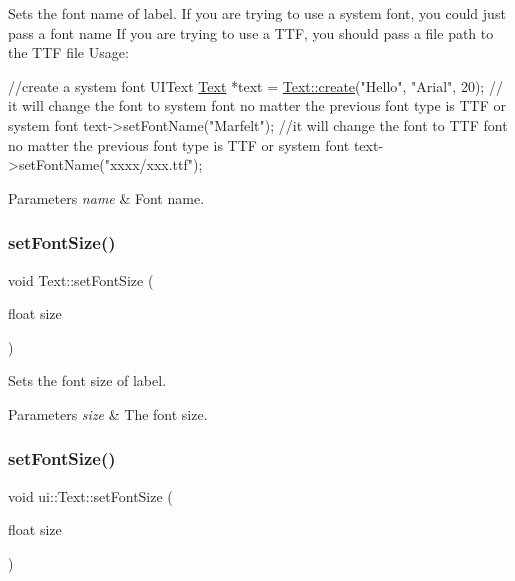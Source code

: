 Sets the font name of label. If you are trying to use a system font, you could just pass a font name If you are trying to use a T\+TF, you should pass a file path to the T\+TF file Usage\+: 
\begin{DoxyCode}
 \textcolor{comment}{//create a system font UIText}
\hyperlink{classText}{Text} *text = \hyperlink{classui_1_1Text_aafdd02d8f0b256cb4997ada4f146e2c2}{Text::create}(\textcolor{stringliteral}{"Hello"}, \textcolor{stringliteral}{"Arial"}, 20);
\textcolor{comment}{// it will change the font to system font no matter the previous font type is TTF or system font}
text->setFontName(\textcolor{stringliteral}{"Marfelt"});
\textcolor{comment}{//it will change the font to TTF font no matter the previous font type is TTF or system font}
text->setFontName(\textcolor{stringliteral}{"xxxx/xxx.ttf"});
\end{DoxyCode}
 
\begin{DoxyParams}{Parameters}
{\em name} & Font name. \\
\hline
\end{DoxyParams}
\mbox{\label{classui_1_1Text_ab084a5776c3dd3c7aef1b88b2c06beb6}} 
\subsubsection{\texorpdfstring{set\+Font\+Size()}{setFontSize()}\hspace{0.1cm}{\footnotesize\ttfamily [1/2]}}
{\footnotesize\ttfamily void Text\+::set\+Font\+Size (\begin{DoxyParamCaption}\item[{float}]{size }\end{DoxyParamCaption})}

Sets the font size of label.


\begin{DoxyParams}{Parameters}
{\em size} & The font size. \\
\hline
\end{DoxyParams}
\mbox{\label{classui_1_1Text_a4850471cc893370ee86d77ffc89456fb}} 
\subsubsection{\texorpdfstring{set\+Font\+Size()}{setFontSize()}\hspace{0.1cm}{\footnotesize\ttfamily [2/2]}}
{\footnotesize\ttfamily void ui\+::\+Text\+::set\+Font\+Size (\begin{DoxyParamCaption}\item[{float}]{size }\end{DoxyParamCaption})}

